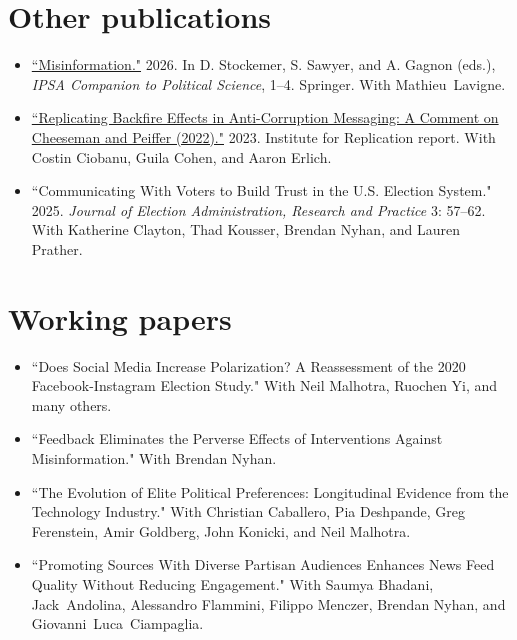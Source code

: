 \documentclass[margin, 10pt]{res}
\begin{document}
\begin{resume}
\section{Other publications}
\begin{itemize}

	\item \href{https://doi.org/10.1007/978-3-032-06918-4_148-1}{``Misinformation."} 2026. In D. Stockemer, S. Sawyer, and A. Gagnon (eds.), \textit{IPSA Companion to Political Science}, 1--4. Springer. With Mathieu~Lavigne.

	\item \href{https://ideas.repec.org/p/zbw/i4rdps/94.html}{``Replicating Backfire Effects in Anti-Corruption Messaging: A Comment on Cheeseman and Peiffer (2022)."}  2023. Institute for Replication report. With Costin Ciobanu, Guila Cohen, and Aaron Erlich.

	\item ``Communicating With Voters to Build Trust in the U.S. Election System." 2025. \textit{Journal of Election Administration, Research and Practice} 3: 57--62. With Katherine Clayton, Thad Kousser, Brendan Nyhan, and Lauren Prather.

\end{itemize}

\section{Working papers}
\begin{itemize}

	\item ``Does Social Media Increase Polarization? A Reassessment of the 2020 Facebook-Instagram Election Study." With Neil Malhotra, Ruochen Yi, and many others.

	\item ``Feedback Eliminates the Perverse Effects of Interventions Against Misinformation." With Brendan Nyhan.

	\item ``The Evolution of Elite Political Preferences: Longitudinal Evidence from the Technology Industry." With Christian Caballero, Pia Deshpande, Greg Ferenstein, Amir Goldberg, John Konicki, and Neil Malhotra.

	\item {\raggedright ``Promoting Sources With Diverse Partisan Audiences Enhances News Feed Quality Without Reducing Engagement." With Saumya Bhadani, \mbox{Jack Andolina}, Alessandro Flammini, Filippo Menczer, Brendan Nyhan, and \mbox{Giovanni Luca Ciampaglia}.\par}


\end{itemize}
\end{resume}
\end{document}
